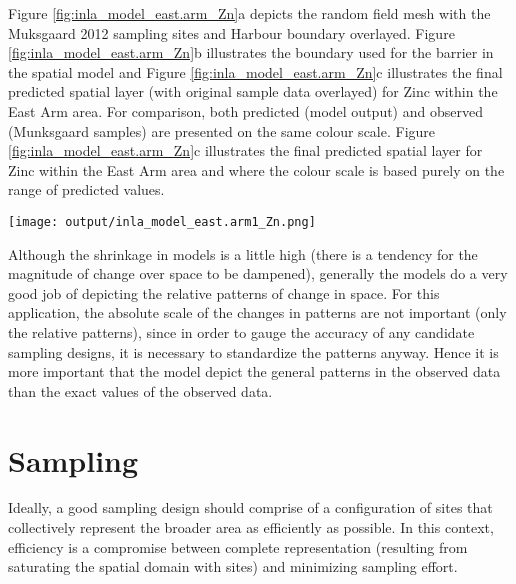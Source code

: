 \documentclass[a4paper]{article}
\let\origfigure=\figure
\let\endorigfigure=\endfigure
\renewenvironment{figure}[1][]{%
   \origfigure[H]
}{%
   \endorigfigure
}
\begin{document}
Figure \ref{fig:inla_model_east.arm_Zn}a depicts the random field mesh
with the Muksgaard 2012 sampling sites and Harbour boundary overlayed.
Figure \ref{fig:inla_model_east.arm_Zn}b illustrates the boundary used
for the barrier in the spatial model and Figure
\ref{fig:inla_model_east.arm_Zn}c illustrates the final predicted
spatial layer (with original sample data overlayed) for Zinc within the
East Arm area. For comparison, both predicted (model output) and
observed (Munksgaard samples) are presented on the same colour scale.
Figure \ref{fig:inla_model_east.arm_Zn}c illustrates the final predicted
spatial layer for Zinc within the East Arm area and where the colour
scale is based purely on the range of predicted values.

\begin{figure}
\centering\scriptsize
\texttt{[image: output/inla\_model\_east.arm1\_Zn.png]}
\caption{Integrated Nested Laplace Approximation (INLA) barrier spatial
modelling of Zinc. The diagram illustrates a) the mesh, b) the barrier
mask, c) the resulting predicted 2D surface (and observed training data
as points) and d) the resulting predicted 2D surface scaled to the range
of predictions.\label{fig:inla_model_east.arm_Zn}}
\end{figure}

Although the shrinkage in models is a little high (there is a tendency
for the magnitude of change over space to be dampened), generally the
models do a very good job of depicting the relative patterns of change
in space. For this application, the absolute scale of the changes in
patterns are not important (only the relative patterns), since in order
to gauge the accuracy of any candidate sampling designs, it is necessary
to standardize the patterns anyway. Hence it is more important that the
model depict the general patterns in the observed data than the exact
values of the observed data.

\clearpage

\hypertarget{sampling}{%
\section{Sampling}\label{sampling}}

Ideally, a good sampling design should comprise of a configuration of
sites that collectively represent the broader area as efficiently as
possible. In this context, efficiency is a compromise between complete
representation (resulting from saturating the spatial domain with sites)
and minimizing sampling effort.
\end{document}
